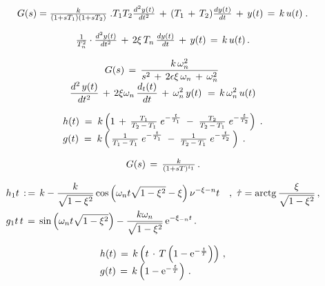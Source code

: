 \documentclass{article}
\begin{document}
\[
$$
G ( s )=\frac{k} {( 1+s T_{1} ) ( 1+s T_{2} )} \;.
$$
$$
T_{1} T_{2} {\frac{d^{2} y ( t )} {d t^{2}}} \,+\, ( T_{1} \,+\, T_{2} ) {\frac{d y ( t )} {d t}} \,+\, y ( t ) \,=\, k \, u ( t ) \;.
$$
\]

\[
$$
\frac{1} {T_{n}^{2}} \cdot\frac{d^{2} y ( t )} {d t^{2}} \,+\, 2 \xi\, T_{n} \, \frac{d y ( t )} {d t} \,+\, y ( t ) \,=\, k \, u ( t ) \,.
$$
\]

\[
$$
\begin{array} {c} {G ( s ) \,=\, \displaystyle{\frac{k \, \omega_{n}^{2}} {s^{2} \,+\, 2 \epsilon\xi\, \omega_{n} \,+\, \omega_{n}^{2}}} \,} \\ {\displaystyle{\frac{d^{2} \, y ( t )} {d t^{2}} \,+\, 2 \xi\omega_{n} \, \displaystyle{\frac{d_{t} ( t )} {d t}} \,+\, \omega_{n}^{2} \, y ( t )} \ =\, k \, \omega_{n}^{2} \, u ( t )} \\ \end{array}
$$
\]

\[
$$
\begin{array} {l} {h ( t ) \;=\; k \left( 1 \,+\, \frac{T_{1}} {T_{2} \,-\, T_{1}} \; e^{-\frac{t} {T_{1}}} \;-\; \frac{T_{2}} {T_{2} \,-\, T_{1}} \; e^{-\frac{t} {T_{2}}} \right) \;.} \\ {g ( t ) \;=\; k \left( \, \frac{1} {T_{1} \,-\, T_{1}} \; e^{-\frac{t} {T_{1}}} \;-\; \frac{1} {T_{2} \,-\, T_{1}} \; e^{-\frac{t} {T_{2}}} \, \right) \;.} \\ \end{array}
$$
\]

\[
$$
G ( s ) \,=\, \frac{k} {( 1+s T )^{i_{1}}} \,.
$$
\]

\[
$$
\begin{aligned} {} & {{} h_{1} t \, : \,=\, k-\frac{k} {\sqrt{1-\xi^{2}}} \operatorname{c o s} \left( \omega_{n} t \sqrt{1-\xi^{2}}-\xi\right) \nu^{-\xi-n} t \quad, \ \dot{\tau}=\operatorname{a r c t g} \frac{\xi} {\sqrt{1-\xi^{2}}} \,,} \\ {} & {{} g_{1} t \, t \,=\, \operatorname{s i n} \left( \omega_{n} t \sqrt{1-\xi^{2}} \right)-\frac{k \omega_{n}} {\sqrt{1-\xi^{2}}} \, \mathrm{e}^{-\xi_{-n} t} \,.} \\ \end{aligned}
$$
\]

\[
$$
\begin{array} {l} {h ( t ) \,=\, k \left( t \, \cdot\, T \left( 1-\mathrm{e}^{-\frac{t} {T}} \right) \right) \,,} \\ {g ( t ) \,=\, k \left( 1-\mathrm{e}^{-\frac{t} {T}} \right) \,.} \\ \end{array}
$$
\]
\end{document}
